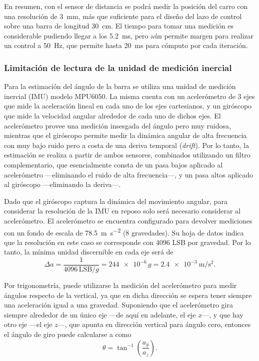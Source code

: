 En resumen, con el sensor de distancia se podrá medir la posición del carro con una resolución de \qty{3}{\mm}, más que suficiente para el diseño del lazo de control sobre una barra de longitud \qty{30}{\cm}. El tiempo para tomar una medición es considerable pudiendo llegar a los \qty{5.2}{\ms}, pero aún permite margen para realizar un control a \qty{50}{\Hz}, que permite hasta \qty{20}{\ms} para cómputo por cada iteración.


\subsubsection{Limitación de lectura de la unidad de medición inercial}

Para la estimación del ángulo de la barra se utiliza una unidad de medición inercial (IMU) modelo MPU6050. La misma cuenta con un acelerómetro de 3 ejes que mide la aceleración lineal en cada uno de los ejes cartesianos, y un giróscopo que mide la velocidad angular alrededor de cada uno de dichos ejes. El acelerómetro provee una medición insesgada del ángulo pero muy ruidosa, mientras que el giróscopo permite medir la dinámica angular de alta frecuencia con muy bajo ruido pero a costa de una deriva temporal (\emph{drift}). Por lo tanto, la estimación se realiza a partir de ambos sensores, combinados utilizando un filtro complementario, que esencialmente consta de un pasa bajos aplicado al acelerómetro ---eliminando el ruido de alta frecuencia---, y un pasa altos aplicado al giróscopo ---eliminando la deriva---.

Dado que el giróscopo captura la dinámica del movimiento angular, para considerar la resolución de la IMU en reposo solo será necesario considerar al acelerómetro. El acelerómetro se encuentra configurado para devolver mediciones con un fondo de escala de \qty{78.5}{\m\per\s\squared} (8 gravedades). Su hoja de datos indica que la resolución en este caso se corresponde con 4096 LSB por gravedad. Por lo tanto, la mínima unidad discernible en cada eje será de
$$\Delta a = \frac{1}{4096 \, \mathrm{LSB}/g} = \num{244e-6} \, g = \qty{2.4e-3}{\m\per\s\squared}.$$

Por trigonometría, puede utilizarse la medición del acelerómetro para medir ángulos respecto de la vertical, ya que en dicha dirección se espera tener siempre una aceleración igual a una gravedad. Suponiendo que el acelerómetro gira siempre alrededor de un único eje ---de aquí en adelante, el eje $x$---, y que hay otro eje ---el eje $z$---, que apunta en dirección vertical para ángulo cero, entonces el ángulo de giro puede calcularse a como
$$\theta = \tan^{-1}\left(\frac{a_y}{a_z}\right).$$


